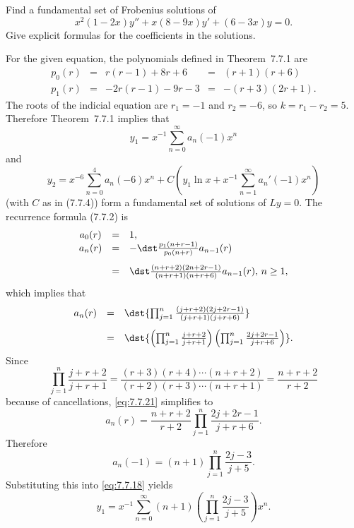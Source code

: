 \setcounter{example}{1}
\begin{example}
  \label{example:7.7.2} \rm Find a fundamental set of Frobenius solutions of
  \[
    x^{2}(1-2x)y''+x(8-9x)y'+(6-3x)y=0.
  \]
  Give explicit formulas for the coefficients in the solutions.
\end{example}
\setcounter{equation}{17}
\begin{examplesolution}
\solution For the given equation, the polynomials defined in Theorem~7.7.1 are
\[
  \begin{array}{ccccc}
    p_{0}(r) & = & r(r-1)+8r+6   & = & (r+1)(r+6)    \\[5pt]
    p_{1}(r) & = & -2r(r-1)-9r-3 & = & -(r+3)(2r+1).
  \end{array}
\]
The roots of the indicial equation are $r_{1}=-1$ and $r_{2}=-6$, so $k=r_{1}-r_{2}=5$. Therefore
Theorem~7.7.1 implies that
\begin{equation}
  \label{eq:7.7.18}y_{1}=x^{-1}\sum_{n=0}^{\infty}a_{n}(-1)x^{n}
\end{equation}
and
\begin{equation}
  \label{eq:7.7.19}y_{2}=x^{-6}\sum_{n=0}^{4}a_{n}(-6)x^{n}+C\left(y_{1}\ln x+x^{-1}\sum_{n=1}^{\infty}a_{n}'(-1)x^{n}\right)
\end{equation}
(with $C$ as in \textup{(7.7.4)}) form a fundamental set of solutions of $Ly=0$. The recurrence
formula \textup{(7.7.2)} is
\begin{equation}
  \label{eq:7.7.20}
  \begin{array}{ccl}
    a_{0}(r) & = & 1,                                                             \\
    a_{n}(r) & = & -\dst\frac{p_{1}(n+r-1)}{p_{0}(n+r)}a_{n-1}(r)                 \\[10pt]
             & = & \dst\frac{(n+r+2)(2n+2r-1)}{(n+r+1)(n+r+6)}a_{n-1}(r),\,n\ge1,
  \end{array}
\end{equation}
which implies that
\begin{equation}
  \label{eq:7.7.21}
  \begin{array}{ccl}
    a_{n}(r) & = & \dst{\prod_{j=1}^{n}\frac{(j+r+2)(2j+2r-1)}{(j+r+1)(j+r+6)}}                                             \\[10pt]
             & = & \dst{\left(\prod_{j=1}^{n}\frac{j+r+2}{j+r+1}\right) \left(\prod_{j=1}^{n}\frac{2j+2r-1}{j+r+6}\right)}.
  \end{array}
\end{equation}
Since
\[
  \prod_{j=1}^{n}\frac{j+r+2}{j+r+1}=\frac{(r+3)(r+4)\cdots(n+r+2)}{(r+2)(r+3)\cdots(n+r+1)}=\frac{n+r+2}{r+2}
\]
because of cancellations, \eqref{eq:7.7.21} simplifies to
\[
  a_{n}(r)=\frac{n+r+2}{r+2}\prod_{j=1}^{n}\frac{2j+2r-1}{j+r+6}.
\]
Therefore
\[
  a_{n}(-1)=(n+1)\prod_{j=1}^{n}\frac{2j-3}{j+5}.
\]
Substituting this into \eqref{eq:7.7.18} yields
\[
  y_{1}=x^{-1}\sum_{n=0}^{\infty}(n+1)\left(\prod_{j=1}^{n}\frac{2j-3}{j+5}\right)x^{n}.
\]


\end{examplesolution}
